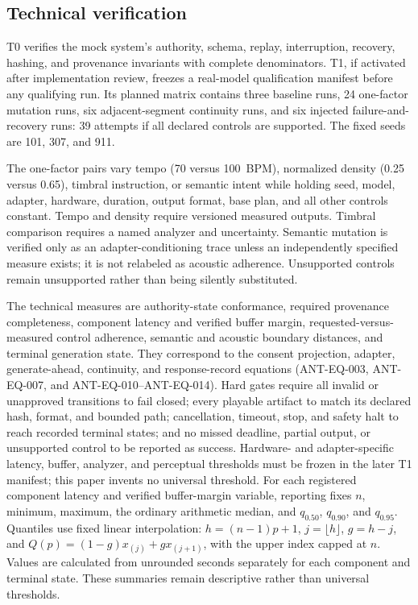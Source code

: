 
\subsection{Technical verification}
\label{sec:methods-technical-verification}

T0 verifies the mock system's authority, schema, replay, interruption,
recovery, hashing, and provenance invariants with complete denominators. T1,
if activated after implementation review, freezes a real-model qualification
manifest before any qualifying run. Its planned matrix contains three baseline
runs, 24 one-factor mutation runs, six adjacent-segment continuity runs, and
six injected failure-and-recovery runs: 39 attempts if all declared controls
are supported. The fixed seeds are 101, 307, and 911.

The one-factor pairs vary tempo (70 versus 100~BPM), normalized density (0.25
versus 0.65), timbral instruction, or semantic intent while holding seed, model,
adapter, hardware, duration, output format, base plan, and all other controls
constant. Tempo and density require versioned measured outputs. Timbral
comparison requires a named analyzer and uncertainty. Semantic mutation is
verified only as an adapter-conditioning trace unless an independently
specified measure exists; it is not relabeled as acoustic adherence. Unsupported
controls remain unsupported rather than being silently substituted.

The technical measures are authority-state conformance, required provenance
completeness, component latency and verified buffer margin, requested-versus-
measured control adherence, semantic and acoustic boundary distances, and
terminal generation state. They correspond to the consent projection,
adapter, generate-ahead, continuity, and response-record equations
(ANT-EQ-003, ANT-EQ-007, and ANT-EQ-010--ANT-EQ-014). Hard gates require all
invalid or unapproved transitions to fail closed; every playable artifact to
match its declared hash, format, and bounded path; cancellation, timeout, stop,
and safety halt to reach recorded terminal states; and no missed deadline,
partial output, or unsupported control to be reported as success. Hardware- and
adapter-specific latency, buffer, analyzer, and perceptual thresholds must be
frozen in the later T1 manifest; this paper invents no universal threshold.
For each registered component latency and verified buffer-margin variable,
reporting fixes $n$, minimum, maximum, the ordinary arithmetic median, and
$q_{0.50}$, $q_{0.90}$, and $q_{0.95}$. Quantiles use fixed linear interpolation:
$h=(n-1)p+1$, $j=\lfloor h\rfloor$, $g=h-j$, and
$Q(p)=(1-g)x_{(j)}+g x_{(j+1)}$, with the upper index capped at $n$. Values are
calculated from unrounded seconds separately for each component and terminal
state. These summaries remain descriptive rather than universal thresholds.

